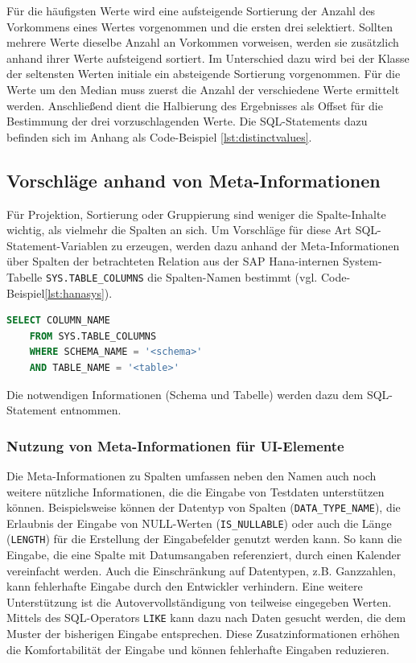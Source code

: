 Für die häufigsten Werte wird eine aufsteigende Sortierung der Anzahl des Vorkommens eines Wertes vorgenommen und die ersten drei selektiert.
Sollten mehrere Werte dieselbe Anzahl an Vorkommen vorweisen, werden sie zusätzlich anhand ihrer Werte aufsteigend sortiert.
Im Unterschied dazu wird bei der Klasse der seltensten Werten initiale ein absteigende Sortierung vorgenommen.
Für die Werte um den Median muss zuerst die Anzahl der verschiedene Werte ermittelt werden.
Anschließend dient die Halbierung des Ergebnisses als Offset für die Bestimmung der drei vorzuschlagenden Werte.
Die SQL-Statements dazu befinden sich im Anhang als Code-Beispiel \ref{lst:distinctvalues}.

\subsection{Vorschläge anhand von Meta-Informationen}\label{chap:databasemeta}
Für Projektion, Sortierung oder Gruppierung sind weniger die Spalte-Inhalte wichtig, als vielmehr die Spalten an sich.
Um Vorschläge für diese Art SQL-Statement-Variablen zu erzeugen, werden dazu anhand der Meta-Informationen über Spalten der betrachteten Relation aus der SAP Hana-internen System-Tabelle \texttt{SYS.TABLE\_COLUMNS} die Spalten-Namen bestimmt (vgl. Code-Beispiel\ref{lst:hanasys}).
\begin{lstlisting}[caption={Systemtabellen von SAP Hana liefern Meta-Informationen zu Relationen}, label={lst:hanasys}, language=SQL]
	SELECT COLUMN_NAME
	FROM SYS.TABLE_COLUMNS
	WHERE SCHEMA_NAME = '<schema>'
	AND TABLE_NAME = '<table>'
\end{lstlisting}
Die notwendigen Informationen (Schema und Tabelle) werden dazu dem SQL-Statement entnommen.

\subsubsection{Nutzung von Meta-Informationen für UI-Elemente}
Die Meta-Informationen zu Spalten umfassen neben den Namen auch noch weitere nützliche Informationen, die die Eingabe von Testdaten unterstützen können.
Beispielsweise können der Datentyp von Spalten (\texttt{DATA\_TYPE\_NAME}), die Erlaubnis der Eingabe von NULL-Werten (\texttt{IS\_NULLABLE}) oder auch die Länge (\texttt{LENGTH}) für die Erstellung der Eingabefelder genutzt werden kann.
So kann die Eingabe, die eine Spalte mit Datumsangaben referenziert, durch einen Kalender vereinfacht werden.
Auch die Einschränkung auf Datentypen, z.B. Ganzzahlen, kann fehlerhafte Eingabe durch den Entwickler verhindern.
Eine weitere Unterstützung ist die Autovervollständigung von teilweise eingegeben Werten.
Mittels des SQL-Operators \texttt{LIKE} kann dazu nach Daten gesucht werden, die dem Muster der bisherigen Eingabe entsprechen.
Diese Zusatzinformationen erhöhen die Komfortabilität der Eingabe und können fehlerhafte Eingaben reduzieren.

